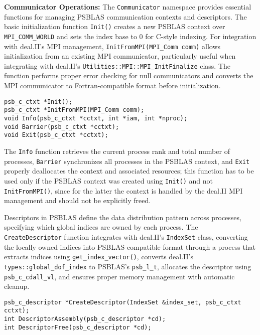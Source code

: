 \documentclass[a4paper,12pt]{article}
\begin{document}
\textbf{Communicator Operations:} The \texttt{Communicator} namespace provides essential functions 
for managing PSBLAS communication contexts and descriptors. The basic initialization function 
\texttt{Init()} creates a new PSBLAS context over \texttt{MPI\_COMM\_WORLD} and sets the index 
base to 0 for C-style indexing. For integration with deal.II's MPI management, 
\lstinline{InitFromMPI(MPI_Comm comm)} allows initialization from an existing MPI communicator, 
particularly useful when integrating with deal.II's \lstinline{Utilities::MPI::MPI_InitFinalize} class. 
The function performs proper error checking for null communicators and converts the MPI communicator to 
Fortran-compatible format before initialization.
\begin{lstlisting}[caption=Core communicator functions]
psb_c_ctxt *Init();
psb_c_ctxt *InitFromMPI(MPI_Comm comm);
void Info(psb_c_ctxt *cctxt, int *iam, int *nproc);
void Barrier(psb_c_ctxt *cctxt);
void Exit(psb_c_ctxt *cctxt);
\end{lstlisting}
The \texttt{Info} function retrieves the current process rank and total number of processes, 
\texttt{Barrier} synchronizes all processes in the PSBLAS context, and \texttt{Exit} properly deallocates 
the context and associated resources; this function has to be used only if the PSBLAS context was created
using \texttt{Init()} and not \texttt{InitFromMPI()}, since for the latter the context is handled by the
deal.II MPI management and should not be explicitly freed.

Descriptors in PSBLAS define the data distribution pattern across processes, specifying which global 
indices are owned by each process. The \texttt{CreateDescriptor} function integrates 
with deal.II's \texttt{IndexSet} class, converting the locally owned indices into PSBLAS-compatible 
format through a process that extracts indices using \texttt{get\_index\_vector()}, converts 
deal.II's \texttt{types::global\_dof\_index} to PSBLAS's \texttt{psb\_l\_t}, allocates the descriptor 
using \texttt{psb\_c\_cdall\_vl}, and ensures proper memory management with automatic cleanup.
\begin{lstlisting}[caption=Descriptor management functions]
psb_c_descriptor *CreateDescriptor(IndexSet &index_set, psb_c_ctxt cctxt);
int DescriptorAssembly(psb_c_descriptor *cd);
int DescriptorFree(psb_c_descriptor *cd);
\end{lstlisting}
\end{document}
